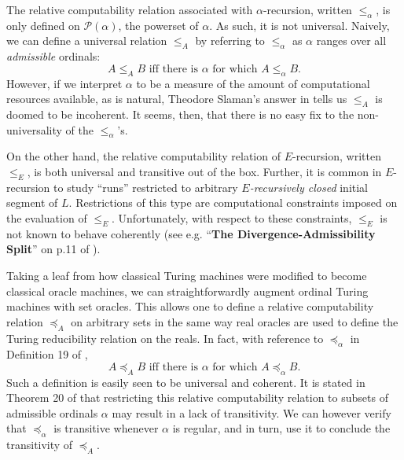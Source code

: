 \documentclass[12pt]{article}
\numberwithin{equation}{section}
\begin{document}
The relative computability relation associated with $\alpha$-recursion, written $\leq_{\alpha}$, is only defined on $\mathcal{P}(\alpha)$, the powerset of $\alpha$. As such, it is not universal. Naively, we can define a universal relation $\leq_A$ by referring to $\leq_{\alpha}$ as $\alpha$ ranges over all \textit{admissible} ordinals: $$A \leq_A B \text{ iff there is } \alpha \text{ for which } A \leq_{\alpha} B \text{.}$$ However, if we interpret $\alpha$ to be a measure of the amount of computational resources available, as is natural, Theodore Slaman's answer in \cite{slaman} tells us $\leq_A$ is doomed to be incoherent. It seems, then, that there is no easy fix to the non-universality of the $\leq_{\alpha}$'s.

On the other hand, the relative computability relation of $E$-recursion, written $\leq_E$, is both universal and transitive out of the box. Further, it is common in $E$-recursion to study ``runs'' restricted to arbitrary $E$\textit{-recursively closed} initial segment of $L$. Restrictions of this type are computational constraints imposed on the evaluation of $\leq_E$. Unfortunately, with respect to these constraints, $\leq_E$ is not known to behave coherently (see e.g. ``\textbf{The Divergence-Admissibility Split}'' on p.11 of \cite{sackserec}).

Taking a leaf from how classical Turing machines were modified to become classical oracle machines, we can straightforwardly augment ordinal Turing machines with set oracles. This allows one to define a relative computability relation $\preceq_A$ on arbitrary sets in the same way real oracles are used to define the Turing reducibility relation on the reals. In fact, with reference to $\preceq_{\alpha}$ in Definition 19 of \cite{koepke2}, $$A \preceq_A B \text{ iff there is } \alpha \text{ for which } A \preceq_{\alpha} B \text{.}$$ Such a definition is easily seen to be universal and coherent. It is stated in Theorem 20 of \cite{koepke2} that restricting this relative computability relation to subsets of admissible ordinals $\alpha$ may result in a lack of transitivity. We can however verify that $\preceq_{\alpha}$ is transitive whenever $\alpha$ is regular, and in turn, use it to conclude the transitivity of $\preceq_A$.
\end{document}

